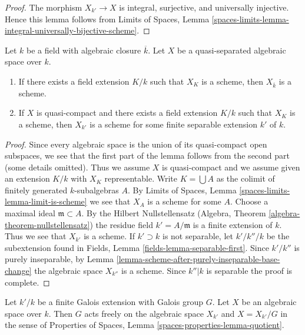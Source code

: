 \begin{proof}
The morphism $X_{k'} \to X$ is integral, surjective, and
universally injective. Hence this lemma follows from
Limits of Spaces, Lemma
\ref{spaces-limits-lemma-integral-universally-bijective-scheme}.
\end{proof}

\begin{lemma}
\label{lemma-when-scheme-after-base-change}
Let $k$ be a field with algebraic closure $\overline{k}$.
Let $X$ be a quasi-separated algebraic space over $k$.
\begin{enumerate}
\item If there exists a field extension $K/k$ such that
$X_K$ is a scheme, then $X_{\overline{k}}$ is a scheme.
\item If $X$ is quasi-compact and there exists a field extension
$K/k$ such that $X_K$ is a scheme, then $X_{k'}$
is a scheme for some finite separable extension $k'$ of $k$.
\end{enumerate}
\end{lemma}

\begin{proof}
Since every algebraic space is the union of its quasi-compact open
subspaces, we see that the first part of the lemma follows from
the second part (some details omitted). Thus we assume $X$ is quasi-compact
and we assume given an extension $K/k$ with $X_K$ representable.
Write $K = \bigcup A$ as the colimit of finitely generated $k$-subalgebras
$A$. By Limits of Spaces, Lemma \ref{spaces-limits-lemma-limit-is-scheme}
we see that $X_A$ is a scheme for some $A$. Choose a maximal ideal
$\mathfrak m \subset A$. By the Hilbert Nullstellensatz
(Algebra, Theorem \ref{algebra-theorem-nullstellensatz})
the residue field $k' = A/\mathfrak m$ is a finite extension of $k$.
Thus we see that $X_{k'}$ is a scheme. If $k' \supset k$ is not
separable, let $k'/k''/k$ be the subextension
found in Fields, Lemma \ref{fields-lemma-separable-first}.
Since $k'/k''$ is purely inseparable, by
Lemma \ref{lemma-scheme-after-purely-inseparable-base-change}
the algebraic space $X_{k''}$ is a scheme. Since $k''|k$ is separable
the proof is complete.
\end{proof}

\begin{lemma}
\label{lemma-base-change-by-Galois}
Let $k'/k$ be a finite Galois extension with Galois group $G$.
Let $X$ be an algebraic space over $k$. Then $G$ acts freely on the
algebraic space $X_{k'}$ and $X = X_{k'}/G$ in the sense of
Properties of Spaces, Lemma \ref{spaces-properties-lemma-quotient}.
\end{lemma}

